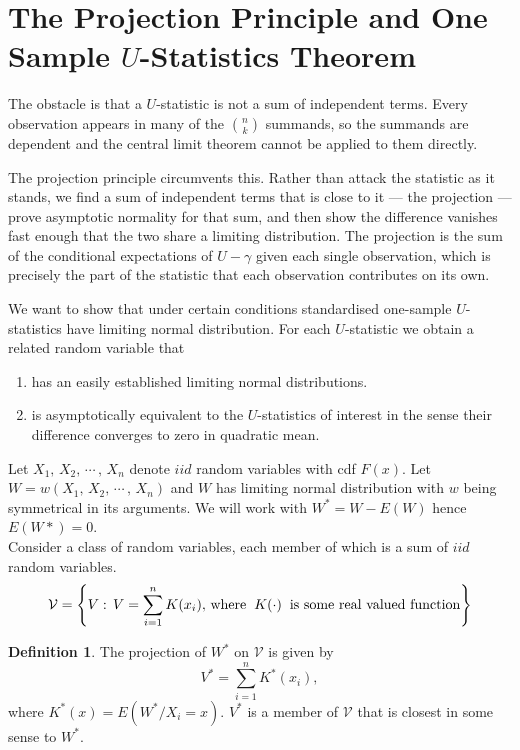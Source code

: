 \documentclass[12pt,a4paper]{report}
\theoremstyle{definition}
\newtheorem{defn}[thm]{Definition}
\theoremstyle{plain}
\begin{document}
\section{The Projection Principle and One Sample $U$-Statistics Theorem}

The obstacle is that a $U$-statistic is not a sum of independent terms. Every
observation appears in many of the $\binom{n}{k}$ summands, so the summands are
dependent and the central limit theorem cannot be applied to them directly.

The projection principle circumvents this. Rather than attack the statistic as
it stands, we find a sum of independent terms that is close to it --- the
projection --- prove asymptotic normality for that sum, and then show the
difference vanishes fast enough that the two share a limiting distribution. The
projection is the sum of the conditional expectations of $U-\gamma$ given each
single observation, which is precisely the part of the statistic that each
observation contributes on its own.

We want to show that under certain conditions standardised one-sample  $U$-statistics have limiting normal distribution. For each $U$-statistic we obtain a related random variable that
\begin{enumerate}
\item[(i)] has an easily established limiting normal distributions.
\item[(ii)] is asymptotically equivalent to the $U$-statistics of interest in the sense their difference converges to zero in quadratic mean.
\end{enumerate}

Let $X_1, \, X_2, \, \cdots\, , \, X_n$ denote $iid$ random variables with cdf $F(x)$. Let $W = w(X_1, \, X_2, \, \cdots\, , \, X_n)$ and $W$ has limiting normal distribution with $w$ being symmetrical in its arguments. We will work with $W^* = W - E(W)$ hence $E(W*) = 0$.\\
Consider a class of random variables, each member of which is a sum of $iid$ random variables.
\begin{equation}
\mathcal{V} = \left\{V:\, V = \sum^n_{i = 1} K(x_i),\, \text{where}\hspace{0.2cm} K(\cdot)\hspace{0.2cm} \text{is some real valued function}\right\}
\end{equation}



\begin{defn}
The projection of $W^*$ on $\mathcal{V}$ is given by $$V^* = \sum^n_{i = 1} K^*(x_i),$$ where $K^*(x) = E\left(W^*/X_i = x\right)$.
$V^*$ is a member of $\mathcal{V}$ that is closest in some sense to $W^*$.
\end{defn}
\end{document}
